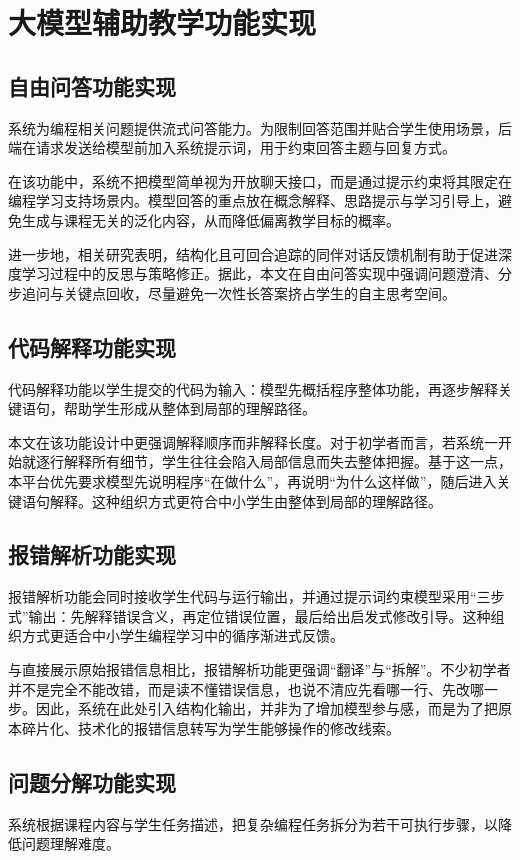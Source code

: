 \section{大模型辅助教学功能实现}
\subsection{自由问答功能实现}
系统为编程相关问题提供流式问答能力。为限制回答范围并贴合学生使用场景，后端在请求发送给模型前加入系统提示词，用于约束回答主题与回复方式。

在该功能中，系统不把模型简单视为开放聊天接口，而是通过提示约束将其限定在编程学习支持场景内。模型回答的重点放在概念解释、思路提示与学习引导上，避免生成与课程无关的泛化内容，从而降低偏离教学目标的概率。

进一步地，相关研究表明，结构化且可回合追踪的同伴对话反馈机制有助于促进深度学习过程中的反思与策略修正\cite{yao2022dialogue,li2023trust}。据此，本文在自由问答实现中强调问题澄清、分步追问与关键点回收，尽量避免一次性长答案挤占学生的自主思考空间。

\subsection{代码解释功能实现}
代码解释功能以学生提交的代码为输入：模型先概括程序整体功能，再逐步解释关键语句，帮助学生形成从整体到局部的理解路径。

本文在该功能设计中更强调解释顺序而非解释长度。对于初学者而言，若系统一开始就逐行解释所有细节，学生往往会陷入局部信息而失去整体把握。基于这一点，本平台优先要求模型先说明程序“在做什么”，再说明“为什么这样做”，随后进入关键语句解释。这种组织方式更符合中小学生由整体到局部的理解路径。

\subsection{报错解析功能实现}
报错解析功能会同时接收学生代码与运行输出，并通过提示词约束模型采用“三步式”输出：先解释错误含义，再定位错误位置，最后给出启发式修改引导。这种组织方式更适合中小学生编程学习中的循序渐进式反馈。

与直接展示原始报错信息相比，报错解析功能更强调“翻译”与“拆解”。不少初学者并不是完全不能改错，而是读不懂错误信息，也说不清应先看哪一行、先改哪一步。因此，系统在此处引入结构化输出，并非为了增加模型参与感，而是为了把原本碎片化、技术化的报错信息转写为学生能够操作的修改线索。

\subsection{问题分解功能实现}
系统根据课程内容与学生任务描述，把复杂编程任务拆分为若干可执行步骤，以降低问题理解难度。

